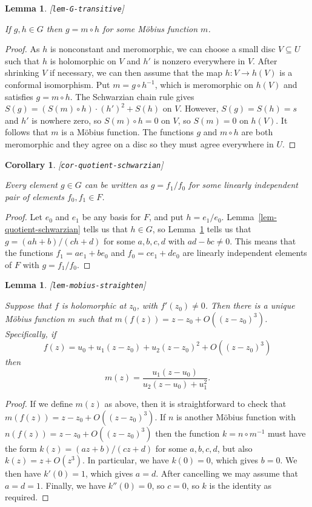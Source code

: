 \documentclass[reqno]{amsart}
\newcommand{\lbl}[1]{\label{#1}\textup{[\texttt{#1}]}\par}
\newcommand{\lbl}{\label}
\newcommand{\sse}       {\subseteq}
\renewcommand{\:}{\colon}
\newtheorem{lemma}[theorem]{Lemma}
\newtheorem{corollary}[theorem]{Corollary}
\theoremstyle{definition}
\begin{document}
\begin{lemma}\lbl{lem-G-transitive}
 If $g,h\in G$ then $g=m\circ h$ for some M\"obius function $m$.
\end{lemma}
\begin{proof}
 As $h$ is nonconstant and meromorphic, we can choose a small disc
 $V\sse U$ such that $h$ is holomorphic on $V$ and $h'$ is nonzero
 everywhere in $V$.  After shrinking $V$ if necessary, we can then
 assume that the map $h\:V\to h(V)$ is a conformal isomorphism.  Put
 $m=g\circ h^{-1}$, which is meromorphic on $h(V)$ and satisfies
 $g=m\circ h$.  The Schwarzian chain rule gives
 $S(g)=(S(m)\circ h)\cdot(h')^2+S(h)$ on $V$.  However, $S(g)=S(h)=s$
 and $h'$ is nowhere zero, so $S(m)\circ h=0$ on $V$, so $S(m)=0$ on
 $h(V)$.  It follows that $m$ is a M\"obius function.  The functions
 $g$ and $m\circ h$ are both meromorphic and they agree on a disc so
 they must agree everywhere in $U$.
\end{proof}

\begin{corollary}\lbl{cor-quotient-schwarzian}
 Every element $g\in G$ can be written as $g=f_1/f_0$ for some
 linearly independent pair of elements $f_0,f_1\in F$.
\end{corollary}
\begin{proof}
 Let $e_0$ and $e_1$ be any basis for $F$, and put $h=e_1/e_0$.
 Lemma~\ref{lem-quotient-schwarzian} tells us that $h\in G$, so
 Lemma~\ref{lem-G-transitive} tells us that $g=(ah+b)/(ch+d)$ for some
 $a,b,c,d$ with $ad-bc\neq 0$.  This means that the functions
 $f_1=ae_1+be_0$ and $f_0=ce_1+de_0$ are linearly independent elements
 of $F$ with $g=f_1/f_0$.
\end{proof}

\begin{lemma}\lbl{lem-mobius-straighten}
 Suppose that $f$ is holomorphic at $z_0$, with $f'(z_0)\neq 0$.  Then
 there is a unique M\"obius function $m$ such that
 $m(f(z))=z-z_0+O((z-z_0)^3)$.  Specifically, if
 \[ f(z) = u_0 + u_1(z-z_0) + u_2(z-z_0)^2 + O((z-z_0)^3) \]
 then
 \[ m(z) = \frac{u_1(z-u_0)}{u_2(z-u_0)+u_1^2}. \]
\end{lemma}
\begin{proof}
 If we define $m(z)$ as above, then it is straightforward to check
 that $m(f(z))=z-z_0+O((z-z_0)^3)$.  If $n$ is another M\"obius
 function with $n(f(z))=z-z_0+O((z-z_0)^3)$ then the function
 $k=n\circ m^{-1}$ must have the form $k(z)=(az+b)/(cz+d)$ for some
 $a,b,c,d$, but also $k(z)=z+O(z^3)$.  In particular, we have
 $k(0)=0$, which gives $b=0$.  We then have $k'(0)=1$, which gives
 $a=d$.  After cancelling we may assume that $a=d=1$.  Finally, we
 have $k''(0)=0$, so $c=0$, so $k$ is the identity as required.
\end{proof}
\end{document}
